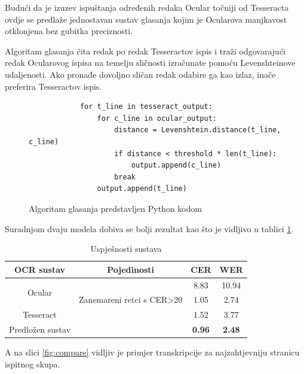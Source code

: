 \documentclass[zavrsnirad]{fer}
\begin{document}
Budući da je izuzev ispuštanja određenih redaka Ocular točniji od Tesseracta ovdje se predlaže jednostavan sustav glasanja kojim je Ocularova manjkavost otklonjena bez gubitka preciznosti.

Algoritam glasanja čita redak po redak Tesseractov ispis i traži odgovarajući redak Ocularovog ispisa na temelju sličnosti izračunate pomoću Levenshteinove udaljenosti. Ako pronađe dovoljno sličan redak odabire ga kao izlaz, inače preferira Tesseractov ispis.

\begin{figure}[h]
	\centering
	\begin{adjustwidth}{1cm}{1cm}
		\begin{lstlisting}
			for t_line in tesseract_output:
				for c_line in ocular_output:
					distance = Levenshtein.distance(t_line, c_line)
					if distance < threshold * len(t_line):
						output.append(c_line)
					break
				output.append(t_line)
		\end{lstlisting}
	\end{adjustwidth}
	\caption{Algoritam glasanja predstavljen Python kodom}
	\label{fig:python_code}
\end{figure}

Suradnjom dvaju modela dobiva se bolji rezultat kao što je vidljivo u tablici \ref{tab:system_performance}.

\bgroup
\def\arraystretch{1.25}
\begin{table}[h]
	\centering
	\begin{tabular}{|c|c|c|c|}
		\hline
		\textbf{OCR sustav} & \textbf{Pojedinosti} & \textbf{CER} & \textbf{WER} \\ \hline
		\multirow{2}{*}{Ocular} & & 8.83 & 10.94 \\ \cline{2-4}
								& Zanemareni retci s CER>20 & 1.05 & 2.74 \\ \hline
		Tesseract & & 1.52 & 3.77 \\ \hline
		Predložen sustav & & \textbf{0.96} & \textbf{2.48} \\ \hline
	\end{tabular}
	\caption{Uspješnosti sustava}
	\label{tab:system_performance}
\end{table}
\egroup

A na slici \ref{fig:compare} vidljiv je primjer transkripcije za najzahtjevniju stranicu ispitnog skupa.
\end{document}
